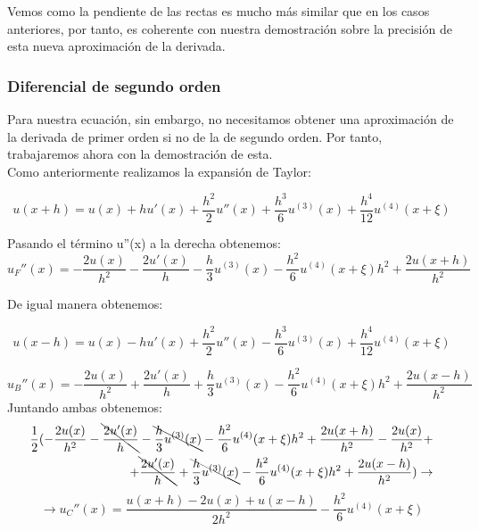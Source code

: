 \documentclass[12pt]{article}
\begin{document}
Vemos como la pendiente de las rectas es mucho más similar que en los casos anteriores, por tanto, es coherente con nuestra demostración sobre la precisión de esta nueva aproximación de la derivada.

\subsubsection{Diferencial de segundo orden}

Para nuestra ecuación, sin embargo, no necesitamos obtener una aproximación de la derivada de primer orden si no de la de segundo orden. Por tanto, trabajaremos ahora con la demostración de esta.\\

Como anteriormente realizamos la expansión de Taylor:

\begin{equation*}
u(x+h)=u(x) + hu'(x)+ \frac{h^2}{2}  u''(x) + \frac{h^3}{6} u^{(3)}(x)+\frac{h^4}{12}u^{(4)}(x+\xi)
\end{equation*}

Pasando el término u''(x) a la derecha obtenemos:
\begin{equation}
u_F''(x)=-\frac{2u(x)}{h^2} - \frac{2u'(x)}{h} - \frac{h}{3}u^{(3)}(x)-\frac{h^2}{6}u^{(4)}(x+\xi) {h^2} + \frac{2u(x+h)}{h^2}
\end{equation}

De igual manera  obtenemos:

\begin{equation*}
u(x-h)=u(x) - hu'(x)+ \frac{h^2}{2}  u''(x) - \frac{h^3}{6} u^{(3)}(x)+\frac{h^4}{12}u^{(4)}(x+\xi)
\end{equation*}

\begin{equation}
u_B''(x)=-\frac{2u(x)}{h^2}  + \frac{2u'(x)}{h} + \frac{h}{3}u^{(3)}(x)-\frac{h^2}{6}u^{(4)}(x+\xi) {h^2} + \frac{2u(x-h)}{h^2}
\end{equation}
Juntando ambas obtenemos:
\begin{eqnarray*}
\frac{1}{2}(-\frac{2u(x)}{h^2} - \bcancel{\frac{2u'(x)}{h}} - \bcancel{\frac{h}{3}u^{(3)}(x)}-\frac{h^2}{6}u^{(4)}(x+\xi) {h^2} + \frac{2u(x+h)}{h^2} -\frac{2u(x)}{h^2} + \\ + \bcancel{\frac{2u'(x)}{h}} +\bcancel{\frac{h}{3}u^{(3)}(x)}-\frac{h^2}{6}u^{(4)}(x+\xi) {h^2} + \frac{2u(x-h)}{h^2}) \rightarrow
\end{eqnarray*}
\begin{equation}
\rightarrow u_C''(x)=\frac{u(x+h)-2u(x)+u(x-h)}{2h^2} - \frac{h^2}{6}u^{(4)}(x+\xi)
\end{equation}
\end{document}
